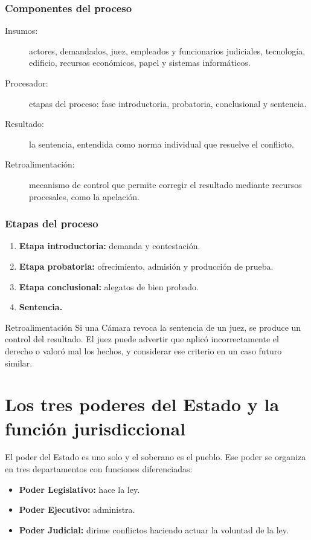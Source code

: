 \documentclass[12pt,oneside]{book}
\begin{document}
\subsection{Componentes del proceso}
\begin{description}
\item[Insumos:] actores, demandados, juez, empleados y funcionarios judiciales, tecnología, edificio, recursos económicos, papel y sistemas informáticos.
\item[Procesador:] etapas del proceso: fase introductoria, probatoria, conclusional y sentencia.
\item[Resultado:] la sentencia, entendida como norma individual que resuelve el conflicto.
\item[Retroalimentación:] mecanismo de control que permite corregir el resultado mediante recursos procesales, como la apelación.
\end{description}

\subsection{Etapas del proceso}
\begin{enumerate}
\item \textbf{Etapa introductoria:} demanda y contestación.
\item \textbf{Etapa probatoria:} ofrecimiento, admisión y producción de prueba.
\item \textbf{Etapa conclusional:} alegatos de bien probado.
\item \textbf{Sentencia.}
\end{enumerate}

\begin{example}{Retroalimentación}
Si una Cámara revoca la sentencia de un juez, se produce un control del resultado. El juez puede advertir que aplicó incorrectamente el derecho o valoró mal los hechos, y considerar ese criterio en un caso futuro similar.
\end{example}

\chapter{Los tres poderes del Estado y la función jurisdiccional}
El poder del Estado es uno solo y el soberano es el pueblo. Ese poder se organiza en tres departamentos con funciones diferenciadas:
\begin{itemize}
\item \textbf{Poder Legislativo:} hace la ley.
\item \textbf{Poder Ejecutivo:} administra.
\item \textbf{Poder Judicial:} dirime conflictos haciendo actuar la voluntad de la ley.
\end{itemize}
\end{document}

